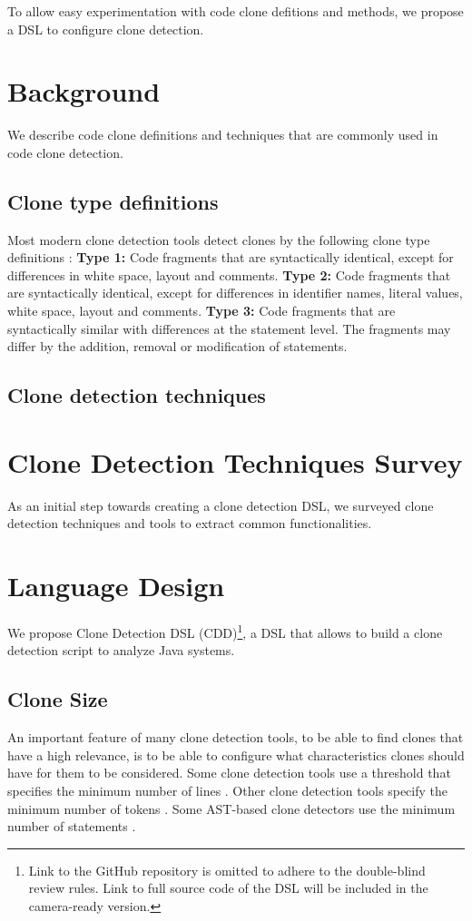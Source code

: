 \documentclass[sigplan,10pt,review,anonymous]{acmart}
\begin{document}
To allow easy experimentation with code clone defitions and methods, we propose a DSL to configure clone detection.

\section{Background}
We describe code clone definitions and techniques that are commonly used in code clone detection.

\subsection{Clone type definitions}
Most modern clone detection tools detect clones by the following clone type definitions \cite{svajlenko2014evaluating}:
\textbf{Type 1:} Code fragments that are syntactically identical, except for differences in white space, layout and comments.
\textbf{Type 2:} Code fragments that are syntactically identical, except for differences in identifier names, literal values, white space, layout and comments.
\textbf{Type 3:} Code fragments that are syntactically similar with differences at the statement level. The fragments may differ by the addition, removal or modification of statements.

\subsection{Clone detection techniques}


\section{Clone Detection Techniques Survey}
As an initial step towards creating a clone detection DSL, we surveyed clone detection techniques and tools to extract common functionalities.

\section{Language Design}
We propose Clone Detection DSL (CDD)\footnote{Link to the GitHub repository is omitted to adhere to the double-blind review rules. Link to full source code of the DSL will be included in the camera-ready version.}, a DSL that allows to build a clone detection script to analyze Java systems.

\subsection{Clone Size}
An important feature of many clone detection tools, to be able to find clones that have a high relevance, is to be able to configure what characteristics clones should have for them to be considered. Some clone detection tools use a threshold that specifies the minimum number of lines \cite{juergens2009clonedetective, ducasse1999language, cordy2011nicad, uddin2013simcad}. Other clone detection tools specify the minimum number of tokens \cite{kamiya2002ccfinder, toomey2012ctcompare, jiang2007deckard}. Some AST-based clone detectors use the minimum number of statements \cite{higo2009enhancing}.
\end{document}
